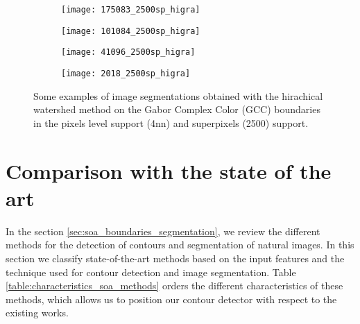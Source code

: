 \begin{figure}[!ht]
    \begin{subfigure}[t]{\textwidth+20pt\relax}
    	\centering
    	\texttt{[image: 175083\_2500sp\_higra]} 
    \end{subfigure}      
    \begin{subfigure}[b]{0.23\textwidth}
    	\centering
        \texttt{[image: 101084\_2500sp\_higra]}
    \end{subfigure}
    \begin{subfigure}[b]{0.23\textwidth}
    	\centering
        \texttt{[image: 41096\_2500sp\_higra]}
    \end{subfigure}
    \begin{subfigure}[b]{0.23\textwidth}
    	\centering
        \texttt{[image: 2018\_2500sp\_higra]}
    \end{subfigure}   
    
	\caption{Some examples of image segmentations obtained with the hirachical watershed method on the Gabor Complex Color (GCC) boundaries in the pixels level support (4nn) and superpixels (2500) support.}\label{fig:GCC_higra_results}    
\end{figure}



\section{Comparison with the state of the art}
In the section \ref{sec:soa_boundaries_segmentation}, we review the different methods for the detection of contours and segmentation of natural images. In this section we classify state-of-the-art methods based on the input features and the technique used for contour detection and image segmentation. Table \ref{table:characteristics_soa_methods} orders the different characteristics of these methods, which allows us to position our contour detector with respect to the existing works. 

